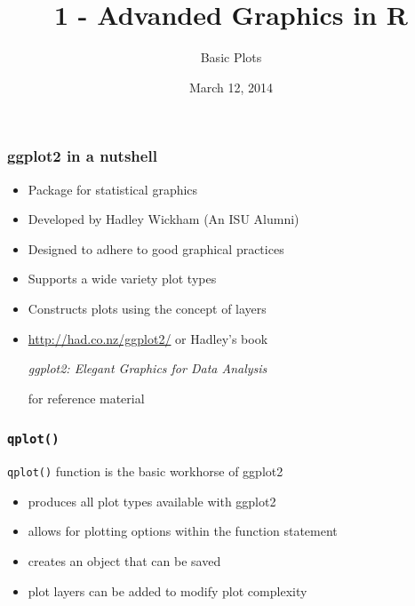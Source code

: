 \documentclass{beamer}\usepackage[]{graphicx}\usepackage[]{color}
\title[ 1 - Advanced Graphics in R ]{1 - Advanded Graphics in R}
\subtitle{Basic Plots}
\date{March 12, 2014}
\institute[ISU]{Iowa State University}
\begin{document}
\begin{frame}
    \maketitle
\end{frame}


\begin{frame}
\frametitle{ggplot2 in a nutshell}
    \begin{itemize}
        \item Package for statistical graphics
        \item Developed by Hadley Wickham (An ISU Alumni)
        \item Designed to adhere to good graphical practices
        \item Supports a wide variety plot types
        \item Constructs plots using the concept of layers\medskip
        \item \url{http://had.co.nz/ggplot2/} or Hadley's book \begin{center}\emph{ggplot2: Elegant Graphics for Data Analysis}\end{center} for reference material
    \end{itemize}    
\end{frame}


\begin{frame}
\frametitle{\texttt{qplot()}}
  \texttt{qplot()} function is the basic workhorse of ggplot2\bigskip
    \begin{itemize}
        \item produces all plot types available with ggplot2\medskip
        \item allows for plotting options within the function statement\medskip
        \item creates an object that can be saved\medskip
        \item plot layers can be added to modify plot complexity
    \end{itemize}    
\end{frame}

\end{document}
